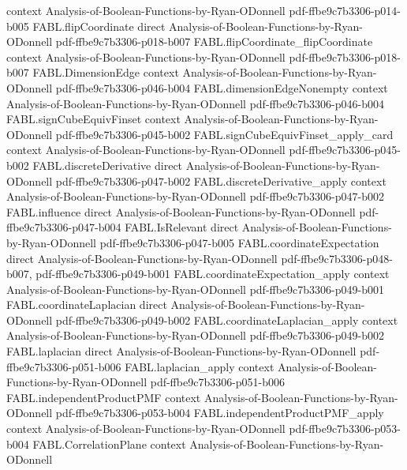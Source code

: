 \begin{theorem}
  {context}
  {Analysis-of-Boolean-Functions-by-Ryan-ODonnell}
  {pdf-ffbe9c7b3306-p014-b005}
\proofstep
  {FABL.flipCoordinate}
  {direct}
  {Analysis-of-Boolean-Functions-by-Ryan-ODonnell}
  {pdf-ffbe9c7b3306-p018-b007}
\proofstep
  {FABL.flipCoordinate_flipCoordinate}
  {context}
  {Analysis-of-Boolean-Functions-by-Ryan-ODonnell}
  {pdf-ffbe9c7b3306-p018-b007}
\proofstep
  {FABL.DimensionEdge}
  {context}
  {Analysis-of-Boolean-Functions-by-Ryan-ODonnell}
  {pdf-ffbe9c7b3306-p046-b004}
\proofstep
  {FABL.dimensionEdgeNonempty}
  {context}
  {Analysis-of-Boolean-Functions-by-Ryan-ODonnell}
  {pdf-ffbe9c7b3306-p046-b004}
\proofstep
  {FABL.signCubeEquivFinset}
  {context}
  {Analysis-of-Boolean-Functions-by-Ryan-ODonnell}
  {pdf-ffbe9c7b3306-p045-b002}
\proofstep
  {FABL.signCubeEquivFinset_apply_card}
  {context}
  {Analysis-of-Boolean-Functions-by-Ryan-ODonnell}
  {pdf-ffbe9c7b3306-p045-b002}
\proofstep
  {FABL.discreteDerivative}
  {direct}
  {Analysis-of-Boolean-Functions-by-Ryan-ODonnell}
  {pdf-ffbe9c7b3306-p047-b002}
\proofstep
  {FABL.discreteDerivative_apply}
  {context}
  {Analysis-of-Boolean-Functions-by-Ryan-ODonnell}
  {pdf-ffbe9c7b3306-p047-b002}
\proofstep
  {FABL.influence}
  {direct}
  {Analysis-of-Boolean-Functions-by-Ryan-ODonnell}
  {pdf-ffbe9c7b3306-p047-b004}
\proofstep
  {FABL.IsRelevant}
  {direct}
  {Analysis-of-Boolean-Functions-by-Ryan-ODonnell}
  {pdf-ffbe9c7b3306-p047-b005}
\proofstep
  {FABL.coordinateExpectation}
  {direct}
  {Analysis-of-Boolean-Functions-by-Ryan-ODonnell}
  {pdf-ffbe9c7b3306-p048-b007,
    pdf-ffbe9c7b3306-p049-b001}
\proofstep
  {FABL.coordinateExpectation_apply}
  {context}
  {Analysis-of-Boolean-Functions-by-Ryan-ODonnell}
  {pdf-ffbe9c7b3306-p049-b001}
\proofstep
  {FABL.coordinateLaplacian}
  {direct}
  {Analysis-of-Boolean-Functions-by-Ryan-ODonnell}
  {pdf-ffbe9c7b3306-p049-b002}
\proofstep
  {FABL.coordinateLaplacian_apply}
  {context}
  {Analysis-of-Boolean-Functions-by-Ryan-ODonnell}
  {pdf-ffbe9c7b3306-p049-b002}
\proofstep
  {FABL.laplacian}
  {direct}
  {Analysis-of-Boolean-Functions-by-Ryan-ODonnell}
  {pdf-ffbe9c7b3306-p051-b006}
\proofstep
  {FABL.laplacian_apply}
  {context}
  {Analysis-of-Boolean-Functions-by-Ryan-ODonnell}
  {pdf-ffbe9c7b3306-p051-b006}
\proofstep
  {FABL.independentProductPMF}
  {context}
  {Analysis-of-Boolean-Functions-by-Ryan-ODonnell}
  {pdf-ffbe9c7b3306-p053-b004}
\proofstep
  {FABL.independentProductPMF_apply}
  {context}
  {Analysis-of-Boolean-Functions-by-Ryan-ODonnell}
  {pdf-ffbe9c7b3306-p053-b004}
\proofstep
  {FABL.CorrelationPlane}
  {context}
  {Analysis-of-Boolean-Functions-by-Ryan-ODonnell}

\end{theorem}
